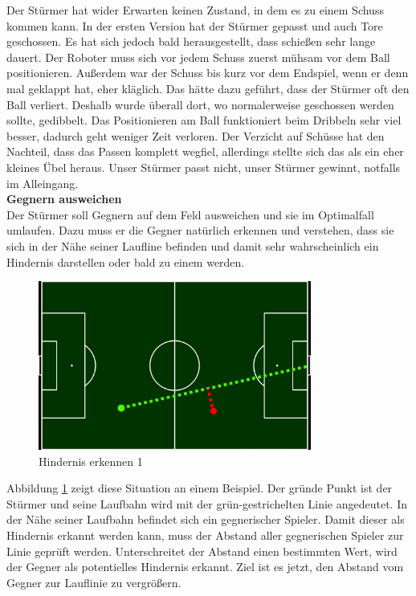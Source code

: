 \documentclass[fontsize=12pt,a4paper,final]{scrartcl}[2003/01/01]
\begin{document}
Der Stürmer hat wider Erwarten keinen Zustand, in dem es zu einem Schuss kommen kann. In der ersten Version hat der Stürmer gepasst und auch Tore geschossen. Es hat sich jedoch bald herausgestellt, dass schießen sehr lange dauert. Der Roboter  muss sich vor jedem Schuss zuerst mühsam vor dem Ball positionieren. Außerdem war der Schuss bis kurz vor dem Endspiel, wenn er denn mal geklappt hat, eher kläglich. Das hätte dazu geführt, dass der Stürmer oft den Ball verliert. Deshalb wurde überall dort, wo normalerweise geschossen werden sollte, gedibbelt. Das Positionieren am Ball funktioniert beim Dribbeln sehr viel besser, dadurch geht weniger Zeit verloren. Der Verzicht auf Schüsse hat den Nachteil, dass das Passen komplett wegfiel, allerdings stellte sich das als ein eher kleines Übel heraus. Unser Stürmer passt nicht, unser Stürmer gewinnt, notfalls im Alleingang.
\\

\textbf{Gegnern ausweichen}
\\

Der Stürmer soll Gegnern auf dem Feld ausweichen und sie im Optimalfall umlaufen. Dazu muss er die Gegner natürlich erkennen und verstehen, dass sie sich in der Nähe seiner Laufline befinden und damit sehr wahrscheinlich ein Hindernis darstellen oder bald zu einem werden.

\begin{figure}[H]
	\centering
	\includegraphics[width=0.8\textwidth]{Grafiken/KI/obstacle_2}
	\caption{Hindernis erkennen 1}
	\label{Hindernis erkennen 1}
\end{figure}

Abbildung \ref{Hindernis erkennen 1} zeigt diese Situation an einem Beispiel. Der gründe Punkt ist der Stürmer und seine Laufbahn wird mit der grün-gestrichelten Linie angedeutet. In der Nähe seiner Laufbahn befindet sich ein gegnerischer Spieler. Damit dieser als Hindernis erkannt werden kann, muss der Abstand aller gegnerischen Spieler  zur Linie geprüft werden. Unterschreitet der Abstand einen bestimmten Wert, wird der Gegner als potentielles Hindernis erkannt. Ziel ist es jetzt, den Abstand vom Gegner zur Lauflinie zu vergrößern.
\end{document}
